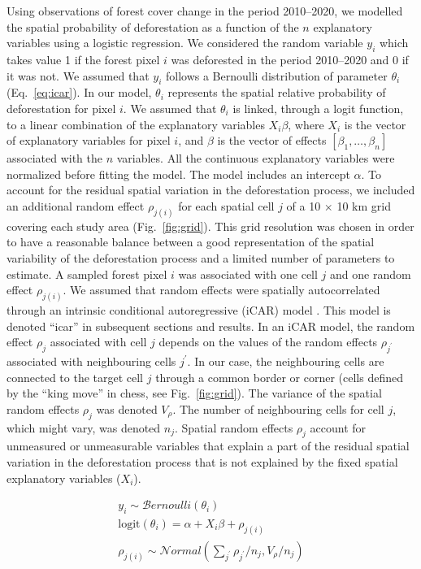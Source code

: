 \documentclass[
  12pt,
]{article}
\begin{document}
Using observations of forest cover change in the period 2010--2020, we modelled the spatial probability of deforestation as a function of the \(n\) explanatory variables using a logistic regression. We considered the random variable \(y_i\) which takes value 1 if the forest pixel \(i\) was deforested in the period 2010--2020 and 0 if it was not. We assumed that \(y_i\) follows a Bernoulli distribution of parameter \(\theta_i\) (Eq.~\eqref{eq:icar}). In our model, \(\theta_i\) represents the spatial relative probability of deforestation for pixel \(i\). We assumed that \(\theta_i\) is linked, through a logit function, to a linear combination of the explanatory variables \(X_i \beta\), where \(X_i\) is the vector of explanatory variables for pixel \(i\), and \(\beta\) is the vector of effects \([\beta_1, \ldots, \beta_n]\) associated with the \(n\) variables. All the continuous explanatory variables were normalized before fitting the model. The model includes an intercept \(\alpha\). To account for the residual spatial variation in the deforestation process, we included an additional random effect \(\rho_{j(i)}\) for each spatial cell \(j\) of a 10 \(\times\) 10 km grid covering each study area (Fig.~\ref{fig:grid}). This grid resolution was chosen in order to have a reasonable balance between a good representation of the spatial variability of the deforestation process and a limited number of parameters to estimate. A sampled forest pixel \(i\) was associated with one cell \(j\) and one random effect \(\rho_{j(i)}\). We assumed that random effects were spatially autocorrelated through an intrinsic conditional autoregressive (iCAR) model \citep{Besag1991}. This model is denoted ``icar'' in subsequent sections and results. In an iCAR model, the random effect \(\rho_j\) associated with cell \(j\) depends on the values of the random effects \(\rho_{j^{\prime}}\) associated with neighbouring cells \(j^{\prime}\). In our case, the neighbouring cells are connected to the target cell \(j\) through a common border or corner (cells defined by the ``king move'' in chess, see Fig.~\ref{fig:grid}). The variance of the spatial random effects \(\rho_j\) was denoted \(V_{\rho}\). The number of neighbouring cells for cell \(j\), which might vary, was denoted \(n_j\). Spatial random effects \(\rho_j\) account for unmeasured or unmeasurable variables \citep{Clark2005} that explain a part of the residual spatial variation in the deforestation process that is not explained by the fixed spatial explanatory variables (\(X_i\)).

\begin{equation}
\begin{split}
  y_i \sim \mathcal{B}ernoulli(\theta_i)\\
  \text{logit}(\theta_i) = \alpha + X_i \beta + \rho_{j(i)}\\
  \rho_{j(i)} \sim \mathcal{N}ormal(\sum_{j^{\prime}} \rho_{j^{\prime}} / n_j,V_{\rho} / n_j)
\end{split}
\label{eq:icar}
\end{equation}
\end{document}
